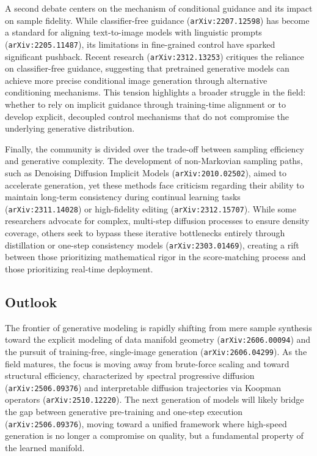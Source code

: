 \documentclass[11pt]{article}
\begin{document}
A second debate centers on the mechanism of conditional guidance and its impact on sample fidelity. While classifier-free guidance (\texttt{arXiv:2207.12598}) has become a standard for aligning text-to-image models with linguistic prompts (\texttt{arXiv:2205.11487}), its limitations in fine-grained control have sparked significant pushback. Recent research (\texttt{arXiv:2312.13253}) critiques the reliance on classifier-free guidance, suggesting that pretrained generative models can achieve more precise conditional image generation through alternative conditioning mechanisms. This tension highlights a broader struggle in the field: whether to rely on implicit guidance through training-time alignment or to develop explicit, decoupled control mechanisms that do not compromise the underlying generative distribution.

Finally, the community is divided over the trade-off between sampling efficiency and generative complexity. The development of non-Markovian sampling paths, such as Denoising Diffusion Implicit Models (\texttt{arXiv:2010.02502}), aimed to accelerate generation, yet these methods face criticism regarding their ability to maintain long-term consistency during continual learning tasks (\texttt{arXiv:2311.14028}) or high-fidelity editing (\texttt{arXiv:2312.15707}). While some researchers advocate for complex, multi-step diffusion processes to ensure density coverage, others seek to bypass these iterative bottlenecks entirely through distillation or one-step consistency models (\texttt{arXiv:2303.01469}), creating a rift between those prioritizing mathematical rigor in the score-matching process and those prioritizing real-time deployment.

\subsection{Outlook}

The frontier of generative modeling is rapidly shifting from mere sample synthesis toward the explicit modeling of data manifold geometry (\texttt{arXiv:2606.00094}) and the pursuit of training-free, single-image generation (\texttt{arXiv:2606.04299}). As the field matures, the focus is moving away from brute-force scaling and toward structural efficiency, characterized by spectral progressive diffusion (\texttt{arXiv:2506.09376}) and interpretable diffusion trajectories via Koopman operators (\texttt{arXiv:2510.12220}). The next generation of models will likely bridge the gap between generative pre-training and one-step execution (\texttt{arXiv:2506.09376}), moving toward a unified framework where high-speed generation is no longer a compromise on quality, but a fundamental property of the learned manifold.
\end{document}
